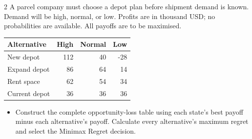 \begin{multicols}{2}\raggedcolumns
{}
A parcel company must choose a depot plan before shipment demand is known. Demand will be high, normal, or low. Profits are in thousand USD; no probabilities are available. All payoffs are to be maximised.
\begin{center}\small\setlength{\tabcolsep}{4pt}
\begin{tabular}{@{}lrrr@{}}\toprule
Alternative&High&Normal&Low\\\midrule
New depot&112&40&-28\\
Expand depot&86&64&14\\
Rent space&62&54&34\\
Current depot&36&36&36\\\bottomrule
\end{tabular}\end{center}
\begin{itemize}\item[\textbf{(C5)}] Construct the complete opportunity-loss table using each state's best payoff minus each alternative's payoff. Calculate every alternative's maximum regret and select the Minimax Regret decision. \end{itemize}


\end{multicols}
